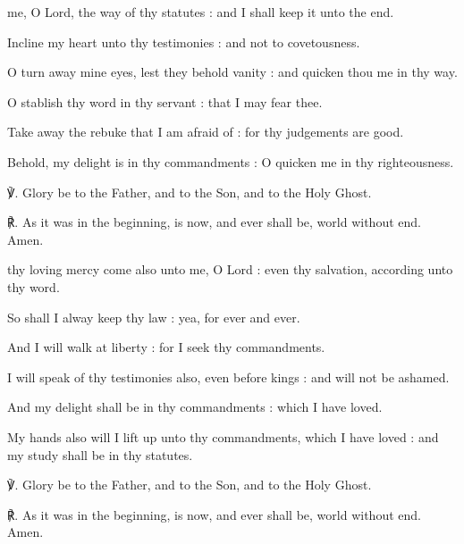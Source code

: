\begin{multicols}{2}
 me, O Lord, the way of thy statutes : and I shall keep it unto the end.\par
{}
Incline my heart unto thy testimonies : and not to covetousness.\par
{}O turn away mine eyes, lest they behold vanity : and quicken thou me in thy way.\par
{}O stablish thy word in thy servant : that I may fear thee.\par
{}Take away the rebuke that I am afraid of : for thy judgements are good.\par
{}Behold, my delight is in thy commandments : O quicken me in thy righteousness.\par
℣. Glory be to the Father, and to the Son, and to the Holy Ghost.\par
℟. As it was in the beginning, is now, and ever shall be, world without end. Amen.

 thy loving mercy come also unto me, O Lord : even thy salvation, according unto thy word.\par
{}
So shall I alway keep thy law : yea, for ever and ever.\par
{}And I will walk at liberty : for I seek thy commandments.\par
{}I will speak of thy testimonies also, even before kings : and will not be ashamed.\par
{}And my delight shall be in thy commandments : which I have loved.\par
{}My hands also will I lift up unto thy commandments, which I have loved : and my study shall be in thy statutes.\par
℣. Glory be to the Father, and to the Son, and to the Holy Ghost.\par
℟. As it was in the beginning, is now, and ever shall be, world without end. Amen.


\end{multicols}
